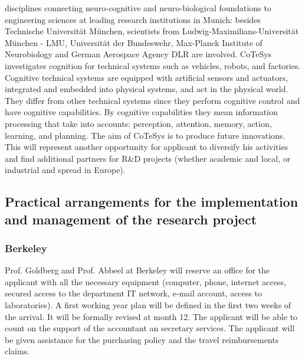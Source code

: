 disciplines    connecting    neuro-cognitive   and    neuro-biological
foundations to  engineering sciences at  leading research institutions
in  Munich: besides  Technische Universit\"at  M\"unchen,  scientists from
Ludwig-Maximilians-Universit\"at   M\"unchen   -   LMU,  Universit\"at   der
Bundeswehr, Max-Planck Institute  of Neurobiology and German Aerospace
Agency  DLR are involved. CoTeSys
investigates cognition for technical systems such as vehicles, robots,
and   factories.  Cognitive  technical   systems  are   equipped  with
artificial  sensors  and   actuators,  integrated  and  embedded  into
physical  systems, and  act in  the physical  world. They  differ from
other technical systems since  they perform cognitive control and have
cognitive   capabilities.   By   cognitive  capabilities   they   mean
information processing that take into accounts: perception, attention,
memory,  action, learning,  and planning.  The  aim of  CoTeSys is  to
produce future  innovations.  This will  represent another opportunity
for applicant to diversify his activities and find additional partners for R\&D
projects  (whether academic  and local,  or industrial  and  spread in
Europe).
\subsection{Practical arrangements for the implementation and 
management of the research project } 
\subsubsection{Berkeley}
Prof. Goldberg and Prof. Abbeel at Berkeley will reserve an office for the 
applicant with all the necessary equipment (computer, phone, internet access, 
secured access to the department IT network, e-mail account, access to laboratories).
A first working year plan will be defined in the first two weeks of the arrival. 
It will be formally revised at month 12. The applicant will be able to count on 
the support  of the accountant an secretary services. The applicant will be given 
assistance for the purchasing policy and the travel reimbursements claims.
